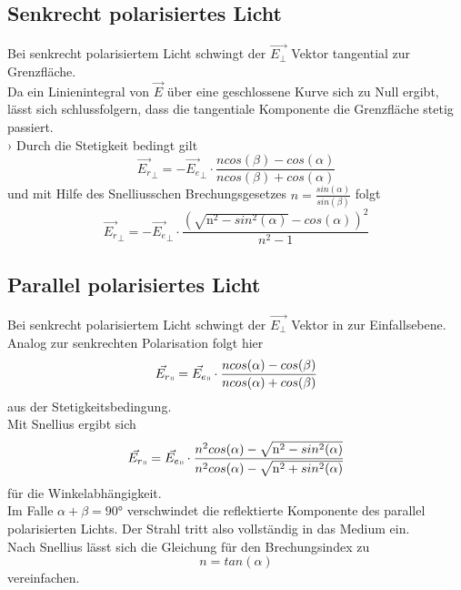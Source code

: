 \subsection{Senkrecht polarisiertes Licht}
Bei senkrecht polarisiertem Licht schwingt der $\vec{E_\bot}$ Vektor tangential zur Grenzfläche.\\
Da ein Linienintegral von $\vec{E}$ über eine geschlossene Kurve sich zu Null ergibt, lässt sich schlussfolgern, dass 
die tangentiale Komponente die Grenzfläche stetig passiert.\\›
Durch die Stetigkeit bedingt gilt
\begin{equation*}
    \vec{E_r}_\bot = -\vec{E_e}_\bot \cdot \frac{n cos(\beta)-cos(\alpha)}{n cos(\beta)+cos(\alpha)}
\end{equation*}
und mit Hilfe des Snelliusschen Brechungsgesetzes $n = \frac{sin(\alpha)}{sin(\beta)}$ folgt 
\begin{equation}
    \vec{E_r}_\bot = -\vec{E_e}_\bot \cdot \frac{(\sqrt{\mathrm{n^2} - sin^2(\alpha)} - cos(\alpha))^2}{n^2 - 1}
    \label{eq:1}
\end{equation}

 \subsection{Parallel polarisiertes Licht}
Bei senkrecht polarisiertem Licht schwingt der $\vec{E_\bot}$ Vektor in zur Einfallsebene.\\
Analog zur senkrechten Polarisation folgt hier
\begin{equation*}
    \vec{E_r}_\shortparallel  = \vec{E_e}_\shortparallel  \cdot \frac{n cos(\alpha)-cos(\beta)}{n cos(\alpha)+cos(\beta)}
\end{equation*}
aus der Stetigkeitsbedingung.\\
Mit Snellius ergibt sich  
\begin{equation}
    \vec{E_r}_\shortparallel  = \vec{E_e}_\shortparallel  \cdot \frac{n^2 cos(\alpha) - \sqrt{\mathrm{n^2} - sin^2(\alpha)}}{n^2 cos(\alpha) - \sqrt{\mathrm{n^2} + sin^2(\alpha)}}
    \label{eq:2}
\end{equation}
für die Winkelabhängigkeit.\\
Im Falle $\alpha + \beta = 90°$ verschwindet die reflektierte Komponente des parallel polarisierten Lichts. Der Strahl tritt also
vollständig in das Medium ein.\\
Nach Snellius lässt sich die Gleichung für den Brechungsindex zu 
\begin{equation}
    n = tan(\alpha)
    \label{eq:3}
\end{equation}
vereinfachen. \\

